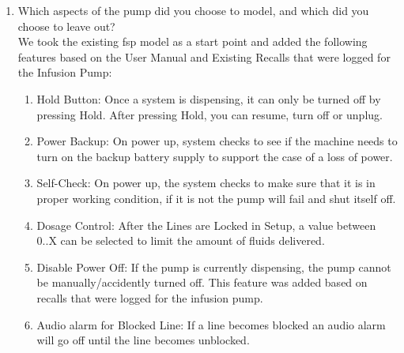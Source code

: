 ﻿\documentclass{article}
\begin{document}
\begin{enumerate}
\item Which aspects of the pump did you choose to model, and which did you choose to leave out? \\


  We took the existing fsp model as a start point and added the following features based on the User Manual and Existing Recalls that were logged for the Infusion Pump: \\
  \begin{enumerate}
  \item Hold Button: Once a system is dispensing, it can only be turned off by pressing Hold. After pressing Hold, you can resume, turn off or unplug.
  \item Power Backup: On power up, system checks to see if the machine needs to turn on the backup battery supply to support the case of a loss of power. 
  \item Self-Check: On power up, the system checks to make sure that it is in proper working condition, if it is not the pump will fail and shut itself off. 
  \item Dosage Control: After the Lines are Locked in Setup, a value between 0..X can be selected to limit the amount of fluids delivered.  
  \item  Disable Power Off: If the pump is currently dispensing, the pump cannot be manually/accidently turned off. This feature was added based on recalls that were logged for the infusion pump. 
\item Audio alarm for Blocked Line: If a line becomes blocked an audio alarm will go off until the line becomes unblocked. \\
\end{enumerate}



\end{enumerate}
\end{document}
